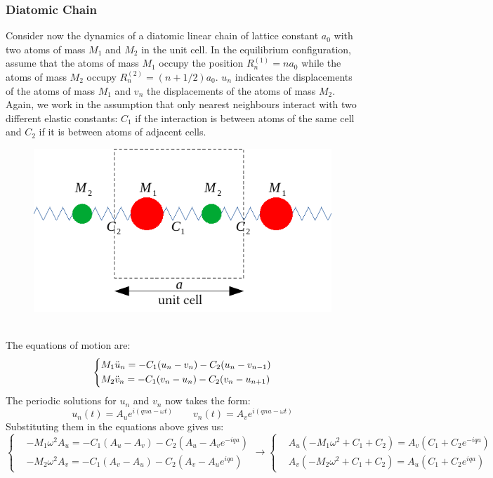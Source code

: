 \documentclass[10.75pt,a4paper,openright,bottom=2cm]{article}
\begin{document}
\subsubsection{Diatomic Chain}
Consider now the dynamics of a diatomic linear chain of lattice constant $a_0$ with two atoms of mass $M_1$ and $M_2$ in the unit cell. In the equilibrium configuration, assume that the atoms of mass $M_1$ occupy the position $R_n^{(1)}=na_0$ while the atoms of mass $M_2$ occupy $R_n^{(2)}=(n+1/2)a_0$. $u_n$ indicates the displacements of the atoms of mass $M_1$ and $v_n$ the displacements of the atoms of mass $M_2$. Again, we work in the assumption that only nearest neighbours interact with two different elastic constants: $C_1$ if the interaction is between atoms of the same cell and $C_2$ if it is between atoms of adjacent cells.
\begin{figure}[h]
    \centering
    \includegraphics{diatomic_chain.pdf}
     
    \label{fig:diatomic_chain}
\end{figure}\\
\noindent
The equations of motion are:
\[
\left\{
\begin{aligned}
&M_1\Ddot{u}_n=-C_1(u_n-v_n)-C_2(u_n-v_{n-1})\\
&M_2\Ddot{v}_n=-C_1(v_n-u_n)-C_2(v_n-u_{n+1})
\end{aligned}
\right.
\]
The periodic solutions for $u_n$ and $v_n$ now takes the form:
\[
u_n(t)=A_ue^{i(qna-\omega t)} \qquad v_n(t)=A_ve^{i(qna-\omega t)}
\]
Substituting them in the equations above gives us:
\[
\left\{
\begin{aligned}
&-M_1\omega^2A_u=-C_1(A_u-A_v)-C_2(A_u-A_ve^{-iqa})\\
&-M_2\omega^2A_v=-C_1(A_v-A_u)-C_2(A_v-A_ue^{iqa})
\end{aligned}
\right.
\to
\left\{
\begin{aligned}
&A_u(-M_1\omega^2+C_1+C_2)=A_v(C_1+C_2e^{-iqa})\\
&A_v(-M_2\omega^2+C_1+C_2)=A_u(C_1+C_2e^{iqa})
\end{aligned}
\right.
\]
\end{document}
